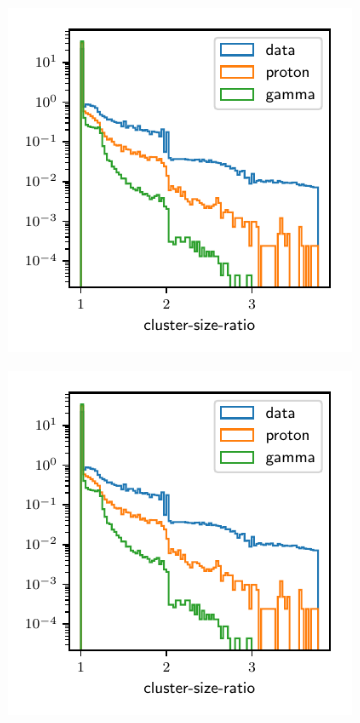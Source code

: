 \begin{figure}
  \begin{subfigure}{0.5\textwidth}
    \includegraphics[width=\textwidth, page=23]{Plots/data_mc/features_DBSCAN_perc.pdf}
  \end{subfigure}
  \begin{subfigure}{0.5\textwidth}
    \includegraphics[width=\textwidth, page=13]{Plots/data_mc/features_DBSCAN_perc.pdf}

\end{subfigure}
\end{figure}
